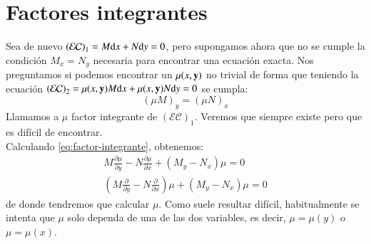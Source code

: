\section{Factores integrantes}
Sea de nuevo $\mathcal{(EC)}_1 = M \mathrm{d} x + N\mathrm{d} y = 0$, pero supongamos ahora que no se cumple la condición $M_x = N_y$ necesaria para encontrar una ecuación exacta. Nos preguntamos si podemos encontrar un $\mu(x, \mathbf{y})$ no trivial de forma que teniendo la ecuación $\mathcal{(EC)}_2 = \mu(x, \mathbf{y}) M \mathrm{d} x + \mu(x, \mathbf{y}) N\mathrm{d} y = 0$ se cumpla:
\begin{equation}\label{eq:factor-integrante}
    (\mu M)_y = (\mu N)_x
\end{equation}
Llamamos a $\mu$ factor integrante de $\mathcal{(EC)}_1$. Veremos que siempre existe pero que es difícil de encontrar.\\
Calculando \ref{eq:factor-integrante}, obtenemos:
\begin{gather*}
    M \frac{\partial \mu}{\partial y} - N \frac{\partial \mu}{\partial x} + (M_y - N_x) \mu = 0\\
    \left(M \frac{\partial}{\partial y} - N \frac{\partial}{\partial x}\right)\mu + (M_y - N_x) \mu = 0
\end{gather*}
de donde tendremos que calcular $\mu$. Como suele resultar difícil, habitualmente se intenta que $\mu$ solo dependa de una de las dos variables, es decir, $\mu=\mu(y)$ o $\mu=\mu(x)$.\\\\

